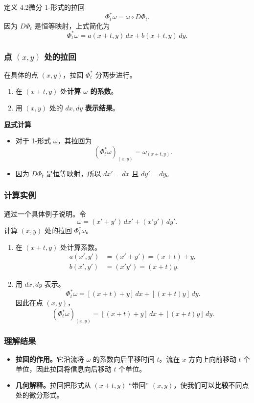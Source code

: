 \begin{statement}{定义 4.2}{微分 1-形式的拉回}
\[
  \Phi_t^*\omega=\omega\circ D\Phi_t.
\]
因为 $D\Phi_t$ 是恒等映射，上式简化为
\[
  \Phi_t^*\omega=a(x+t,y)\,dx+b(x+t,y)\,dy.
\]
\end{statement}

\subsubsection{\texorpdfstring{点 $(x,y)$ 处的拉回}{点 (x,y) 处的拉回}}
在具体的点 $(x,y)$，拉回 $\Phi_t^*$ 分两步进行。
\begin{enumerate}
  \item 在 $(x+t,y)$ 处\textbf{计算 $\omega$ 的系数}。
  \item 用 $(x,y)$ 处的 $dx,dy$ \textbf{表示结果}。
\end{enumerate}

\textbf{显式计算}
\begin{itemize}
  \item 对于 1-形式 $\omega$，其拉回为
  \[
    (\Phi_t^*\omega)_{(x,y)}=\omega_{(x+t,y)}.
  \]
  \item 因为 $D\Phi_t$ 是恒等映射，所以 $dx'=dx$ 且 $dy'=dy$。
\end{itemize}

\subsubsection{计算实例}
通过一个具体例子说明。令
\[
  \omega=(x'+y')\,dx'+(x'y')\,dy'.
\]
计算 $(x,y)$ 处的拉回 $\Phi_t^*\omega$。
\begin{enumerate}
  \item 在 $(x+t,y)$ 处计算系数。
  \[
    \begin{aligned}
      a(x',y')&=(x'+y')=(x+t)+y,\\
      b(x',y')&=(x'y')=(x+t)y.
    \end{aligned}
  \]
  \item 用 $dx,dy$ 表示。
  \[
    \Phi_t^*\omega=[(x+t)+y]\,dx+[(x+t)y]\,dy.
  \]
  因此在点 $(x,y)$，
  \[
    (\Phi_t^*\omega)_{(x,y)}=[(x+t)+y]\,dx+[(x+t)y]\,dy.
  \]
\end{enumerate}

\subsubsection{理解结果}
\begin{itemize}
  \item \textbf{拉回的作用。}它沿流将 $\omega$ 的系数向后平移时间 $t$。流在 $x$ 方向上向前移动 $t$ 个单位，因此拉回将信息向后移动 $t$ 个单位。
  \item \textbf{几何解释。}拉回把形式从 $(x+t,y)$ “带回” $(x,y)$，使我们可以\textbf{比较}不同点处的微分形式。
\end{itemize}

